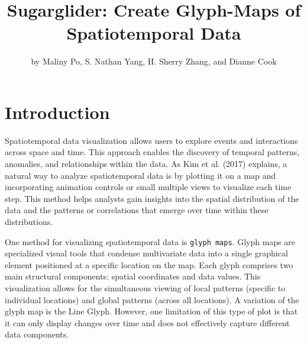 \title{Sugarglider: Create Glyph-Maps of Spatiotemporal Data}


\author{by Maliny Po, S. Nathan Yang, H. Sherry Zhang, and Dianne Cook}

\maketitle


\hypertarget{introduction}{%
\section{Introduction}\label{introduction}}

Spatiotemporal data visualization allows users to explore events and interactions across space and time. This approach enables the discovery of temporal patterns, anomalies, and relationships within the data. As Kim et al. (2017) explains, a natural way to analyze spatiotemporal data is by plotting it on a map and incorporating animation controls or small multiple views to visualize each time step. This method helps analysts gain insights into the spatial distribution of the data and the patterns or correlations that emerge over time within these distributions.

One method for visualizing spatiotemporal data is \texttt{glyph\ maps}. Glyph maps are specialized visual tools that condense multivariate data into a single graphical element positioned at a specific location on the map. Each glyph comprises two main structural components: spatial coordinates and data values. This visualization allows for the simultaneous viewing of local patterns (specific to individual locations) and global patterns (across all locations). A variation of the glyph map is the Line Glyph. However, one limitation of this type of plot is that it can only display changes over time and does not effectively capture different data components.

